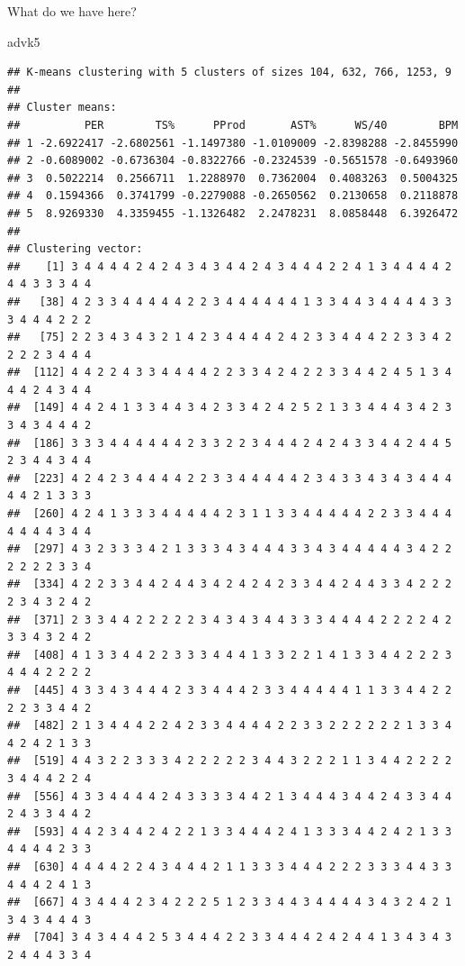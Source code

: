 \documentclass[]{book}
\newenvironment{Shaded}{\begin{snugshade}}{\end{snugshade}}
\newcommand{\NormalTok}[1]{#1}
\begin{document}
What do we have here?

\begin{Shaded}
\begin{Highlighting}[]
\NormalTok{advk5}
\end{Highlighting}
\end{Shaded}

\begin{verbatim}
## K-means clustering with 5 clusters of sizes 104, 632, 766, 1253, 9
## 
## Cluster means:
##          PER        TS%      PProd       AST%      WS/40        BPM
## 1 -2.6922417 -2.6802561 -1.1497380 -1.0109009 -2.8398288 -2.8455990
## 2 -0.6089002 -0.6736304 -0.8322766 -0.2324539 -0.5651578 -0.6493960
## 3  0.5022214  0.2566711  1.2288970  0.7362004  0.4083263  0.5004325
## 4  0.1594366  0.3741799 -0.2279088 -0.2650562  0.2130658  0.2118878
## 5  8.9269330  4.3359455 -1.1326482  2.2478231  8.0858448  6.3926472
## 
## Clustering vector:
##    [1] 3 4 4 4 4 2 4 2 4 3 4 3 4 4 2 4 3 4 4 4 2 2 4 1 3 4 4 4 4 2 4 4 3 3 3 4 4
##   [38] 4 2 3 3 4 4 4 4 4 2 2 3 4 4 4 4 4 4 1 3 3 4 4 3 4 4 4 4 3 3 3 4 4 4 2 2 2
##   [75] 2 2 3 4 3 4 3 2 1 4 2 3 4 4 4 4 2 4 2 3 3 4 4 4 2 2 3 3 4 2 2 2 2 3 4 4 4
##  [112] 4 4 2 2 4 3 3 4 4 4 4 2 2 3 3 4 2 4 2 2 3 3 4 4 2 4 5 1 3 4 4 4 2 4 3 4 4
##  [149] 4 4 2 4 1 3 3 4 4 3 4 2 3 3 4 2 4 2 5 2 1 3 3 4 4 4 3 4 2 3 3 4 3 4 4 4 2
##  [186] 3 3 3 4 4 4 4 4 4 2 3 3 2 2 3 4 4 4 2 4 2 4 3 3 4 4 2 4 4 5 2 3 4 4 3 4 4
##  [223] 4 2 4 2 3 4 4 4 4 2 2 3 3 4 4 4 4 4 2 3 4 3 3 4 3 4 3 4 4 4 4 4 2 1 3 3 3
##  [260] 4 2 4 1 3 3 3 4 4 4 4 4 2 3 1 1 3 3 4 4 4 4 4 2 2 3 3 4 4 4 4 4 4 4 3 4 4
##  [297] 4 3 2 3 3 3 4 2 1 3 3 3 4 3 4 4 4 3 3 4 3 4 4 4 4 4 3 4 2 2 2 2 2 2 3 3 4
##  [334] 4 2 2 3 3 4 4 2 4 4 3 4 2 4 2 4 2 3 3 4 4 2 4 4 3 3 4 2 2 2 2 3 4 3 2 4 2
##  [371] 2 3 3 4 4 2 2 2 2 2 3 4 3 4 3 4 4 3 3 3 4 4 4 4 2 2 2 2 4 2 3 3 4 3 2 4 2
##  [408] 4 1 3 3 4 4 2 2 3 3 3 4 4 4 1 3 3 2 2 1 4 1 3 3 4 4 2 2 2 3 4 4 4 2 2 2 2
##  [445] 4 3 3 4 3 4 4 4 2 3 3 4 4 4 2 3 3 4 4 4 4 4 1 1 3 3 4 4 2 2 2 2 3 3 4 4 2
##  [482] 2 1 3 4 4 4 2 2 4 2 3 3 4 4 4 4 2 2 3 3 2 2 2 2 2 2 1 3 3 4 4 2 4 2 1 3 3
##  [519] 4 4 3 2 2 3 3 3 4 2 2 2 2 2 3 4 4 3 2 2 2 1 1 3 4 4 2 2 2 2 3 4 4 4 2 2 4
##  [556] 4 3 3 4 4 4 4 2 4 3 3 3 3 4 4 2 1 3 4 4 4 3 4 4 2 4 3 3 4 4 2 4 3 3 4 4 2
##  [593] 4 4 2 3 4 4 2 4 2 2 1 3 3 4 4 4 2 4 1 3 3 3 4 4 2 4 2 1 3 3 4 4 4 4 2 3 3
##  [630] 4 4 4 4 2 2 4 3 4 4 4 2 1 1 3 3 3 4 4 4 2 2 2 3 3 3 4 4 3 3 4 4 4 2 4 1 3
##  [667] 4 3 4 4 4 2 3 4 2 2 2 5 1 2 3 3 4 4 3 4 4 4 4 3 4 3 2 4 2 1 3 4 3 4 4 4 3
##  [704] 3 4 3 4 4 4 2 5 3 4 4 4 2 2 3 3 4 4 4 2 4 2 4 4 1 3 4 3 4 3 2 4 4 4 3 3 4

\end{verbatim}
\end{document}
